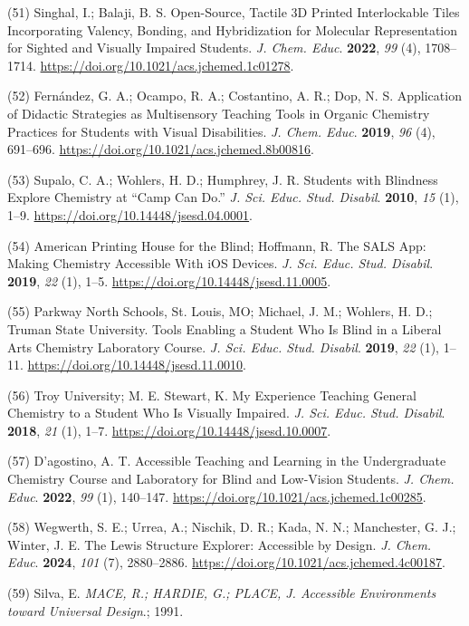 \documentclass[11.5pt]{sig-alternate} %
\begin{document}
(51)	Singhal, I.; Balaji, B. S. Open-Source, Tactile 3D Printed Interlockable Tiles Incorporating Valency, Bonding, and Hybridization for Molecular Representation for Sighted and Visually Impaired Students. \textit{J. Chem. Educ}. \textbf{2022}, \textit{99} (4), 1708–1714. \url{https://doi.org/10.1021/acs.jchemed.1c01278}.

(52)	Fernández, G. A.; Ocampo, R. A.; Costantino, A. R.; Dop, N. S. Application of Didactic Strategies as Multisensory Teaching Tools in Organic Chemistry Practices for Students with Visual Disabilities. \textit{J. Chem. Educ}. \textbf{2019}, \textit{96} (4), 691–696. \url{https://doi.org/10.1021/acs.jchemed.8b00816}.

(53)	Supalo, C. A.; Wohlers, H. D.; Humphrey, J. R. Students with Blindness Explore Chemistry at “Camp Can Do.” \textit{J. Sci. Educ. Stud. Disabil}. \textbf{2010}, \textit{15} (1), 1–9. \url{https://doi.org/10.14448/jsesd.04.0001}.

(54)	American Printing House for the Blind; Hoffmann, R. The SALS App: Making Chemistry Accessible With iOS Devices. \textit{J. Sci. Educ. Stud. Disabil}. \textbf{2019}, \textit{22} (1), 1–5. \url{https://doi.org/10.14448/jsesd.11.0005}.

(55)	Parkway North Schools, St. Louis, MO; Michael, J. M.; Wohlers, H. D.; Truman State University. Tools Enabling a Student Who Is Blind in a Liberal Arts Chemistry Laboratory Course. \textit{J. Sci. Educ. Stud. Disabil}. \textbf{2019}, \textit{22} (1), 1–11. 
\url{https://doi.org/10.14448/jsesd.11.0010}.

(56)	Troy University; M. E. Stewart, K. My Experience Teaching General Chemistry to a Student Who Is Visually Impaired. \textit{J. Sci. Educ. Stud. Disabil}. \textbf{2018}, \textit{21} (1), 1–7. \url{https://doi.org/10.14448/jsesd.10.0007}.

(57)	D’agostino, A. T. Accessible Teaching and Learning in the Undergraduate Chemistry Course and Laboratory for Blind and Low-Vision Students. \textit{J. Chem. Educ}. \textbf{2022}, \textit{99} (1), 140–147. \url{https://doi.org/10.1021/acs.jchemed.1c00285}.

(58)	Wegwerth, S. E.; Urrea, A.; Nischik, D. R.; Kada, N. N.; Manchester, G. J.; Winter, J. E. The Lewis Structure Explorer: Accessible by Design. \textit{J. Chem. Educ}. \textbf{2024}, \textit{101} (7), 2880–2886. \url{https://doi.org/10.1021/acs.jchemed.4c00187}.

(59)	Silva, E. \textit{MACE, R.; HARDIE, G.; PLACE, J. Accessible Environments toward Universal Design}.; 1991.
\end{document}
